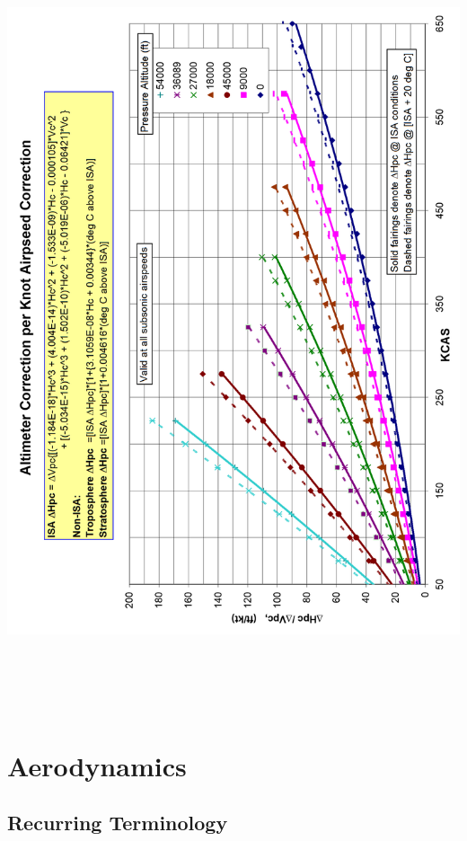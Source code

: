 \documentclass[
]{book}
\begin{document}
\includegraphics[width=6.51111in,height=9in]{media/04/image58.png}

\hypertarget{aerodynamics}{%
\chapter{Aerodynamics}\label{aerodynamics}}

\hypertarget{recurring-terminology}{%
\section*{Recurring Terminology}\label{recurring-terminology}}
\end{document}
